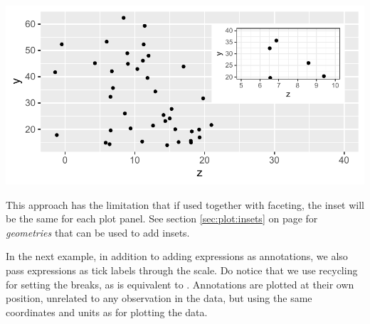 \documentclass[krantz2]{krantz}\usepackage{knitr}
\begin{document}
\begin{knitrout}\footnotesize
{}\color{fgcolor}\begin{kframe}
\begin{alltt}
 \hlkwb{<-}   \hlopt{+}
  \hlstd{()}
 \hlopt{+} \hlstd{(} \hlstd{=} \hlstd{)} \hlopt{+}
  \hlstd{(} \hlopt{+} \hlstd{(} \hlstd{=} \hlstd{(}\hlstd{,} \hlstd{),}  \hlstd{=} \hlstd{(}\hlstd{,} \hlstd{))} \hlopt{+}
                               \hlstd{(}\hlstd{)),}
                     \hlstd{=} \hlstd{,}  \hlstd{=} \hlstd{,}  \hlstd{=} \hlstd{,}  \hlstd{=} \hlstd{)}
\end{alltt}
\end{kframe}

{\centering \includegraphics[width=.7\textwidth]{figure/pos-inset-01-1}

}



\end{knitrout}

This approach has the limitation that if used together with faceting, the inset will be the same for each plot panel. See section \ref{sec:plot:insets} on page \pageref{sec:plot:insets} for \emph{geometries} that can be used to add insets.

In the next example, in addition to adding expressions as annotations, we also pass expressions as tick labels through the scale. Do notice that we use recycling for setting the breaks, as  is equivalent to . Annotations are plotted at their own position, unrelated to any observation in the data, but using the same coordinates and units as for plotting the data.
\end{document}
